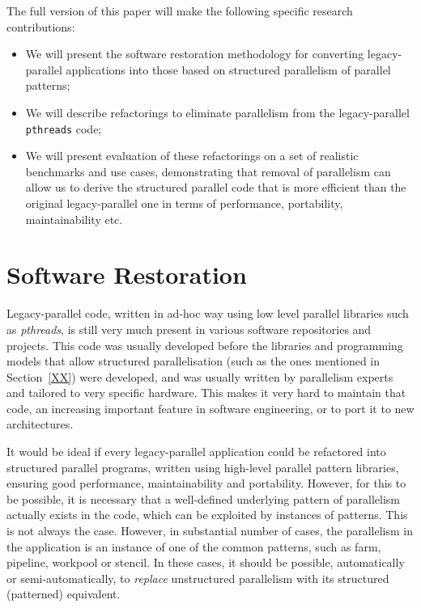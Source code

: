 \documentclass{llncs}
\begin{document}
The full version of this paper will make the following specific research contributions:
\begin{itemize}
    \item We will present the software restoration methodology for converting legacy-parallel applications into those based on structured parallelism of parallel patterns;
    \item We will describe refactorings to eliminate parallelism from the legacy-parallel \lstinline{pthreads} code;
    \item We will present evaluation of these refactorings on a set of realistic benchmarks and use cases, demonstrating that removal of parallelism can allow us to derive the structured parallel code that is more efficient than the original legacy-parallel one in terms of performance, portability, maintainability etc.
\end{itemize}

\section{Software Restoration} \label{sec:softRest}

Legacy-parallel code, written in ad-hoc way using low level parallel libraries such as \emph{pthreads}, is still very much present in various software repositories and projects. This code was usually developed before the libraries and programming models that allow structured parallelisation (such as the ones mentioned in Section~\ref{XX}) were developed, and was usually written by parallelism experts and tailored to very specific hardware. This makes it very hard to maintain that code, an increasing important feature in software engineering, or to port it to new architectures. 

It would be ideal if every legacy-parallel application could be refactored into structured parallel programs, written using high-level parallel pattern libraries, ensuring good performance, maintainability and portability. However, for this to be possible, it is necessary that a well-defined underlying pattern of parallelism actually exists in the code, which can be exploited by instances of patterns. This is not always the case. However, in substantial number of cases, the parallelism in the application is an instance of one of the common patterns, such as farm, pipeline, workpool or stencil. In these cases, it should be possible, automatically or semi-automatically, to \emph{replace} unstructured parallelism with its structured (patterned) equivalent.   
\end{document}
